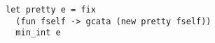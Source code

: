 \begin{lstlisting}
let pretty e = fix 
  (fun fself -> gcata (new pretty fself))
  min_int e
\end{lstlisting}


\begin{comment}


\subsection{Преобразование ``\texttt{fold}''} 

Выше мы смогли выделить две общие части для двух существенно различных преобразований: функцию обобщенного обхода
( ``\lstinline{gcata}'') и такой виртуальный класс (``\lstinline{expr}''), что все преобразования можно представить как его экземпляры.
Но стоило ли это того? В действительности, в этом примере мы добились не очень большого переиспользования кода путём добавления
большого количества абстракций. Итоговый код получился по размеру даже больше исходного.

Мы утверждаем, что преобразования в данном конкретном случае были недостаточно обобщенные. Чтобы оправдать описанный подход,
давайте рассмотрим более оптимистичный сценарий. Широко известно, что многие трансформации могут быть представлены 
(по понятным причинам) как \emph{катаморфизмы}, т.е. как ``свёртки''~\cite{CalculatingFP,Fold,Bananas}. 
Формально, чтобы определить канонический катаморфизм нам нужно абстрагировать тип ``\lstinline{expr}'' 
от самого себя\footnote{Подробнее см. в~\cite{CalculatingFP}}, но здесь мы воспользуемся более легковесным решением:


\begin{lstlisting}
class [$\iota$] fold (fself : $\iota$ -> expr -> $\iota$) = 
object 
  inherit [$\iota$, $\iota$] $\inbr{expr}$ 
  method $\inbr{Const}$ i n = i
  method $\inbr{Var}$ i x = i
  method $\inbr{Binop}$ i o l r = 
    fself (fself i l) r
end
\end{lstlisting}

\noindent Эта реализация просто передает ``$\iota$'' сквозь все узлы трансформируемого значения, что на первый взгляд выглядит довольно бесполезно.
Однако, слегка изменив поведение, можно получить кое-что полезное:

\begin{lstlisting}
let fv e = fix (fun fself ->
  gcata (object 
    inherit [string list] fold fself
    method $\inbr{Var}$ i x = x :: i
  end)) 
  [] e
\end{lstlisting}


\end{comment}
